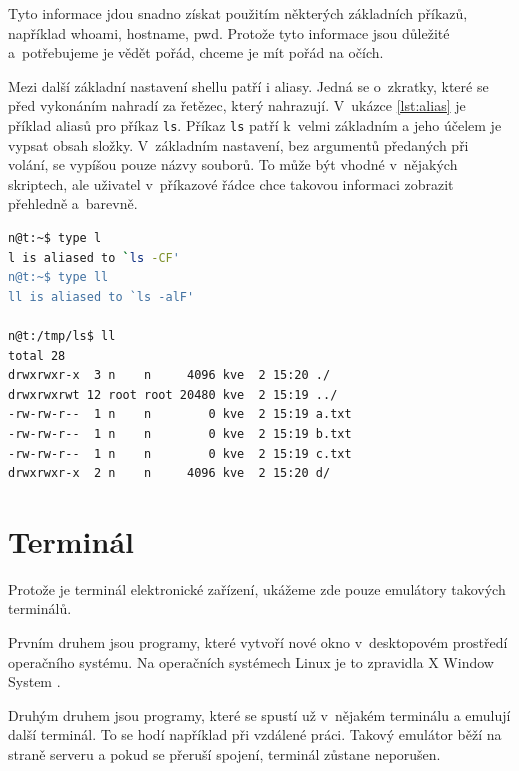 \documentclass[thesis=M,czech]{FITthesis}[2012/06/26]
\begin{document}
Tyto informace jdou snadno získat použitím některých základních příkazů, například whoami, hostname, pwd. Protože tyto informace jsou důležité a~potřebujeme je vědět pořád, chceme je mít pořád na očích.

Mezi další základní nastavení shellu patří i aliasy. Jedná se o~zkratky, které se před vykonáním nahradí za řetězec, který nahrazují. V~ukázce \ref{lst:alias} je příklad aliasů pro příkaz \texttt{ls}. Příkaz \texttt{ls} patří k~velmi základním a jeho účelem je vypsat obsah složky. V~základním nastavení, bez argumentů předaných při volání, se vypíšou pouze názvy souborů. To může být vhodné v~nějakých skriptech, ale uživatel v~příkazové řádce chce takovou informaci zobrazit přehledně a~barevně.

\noindent
\begin{minipage}{\linewidth}
\begin{lstlisting}[language=bash, caption={Příklad použití aliasu v~Bashi}, label={lst:alias}]
n@t:~$ type l
l is aliased to `ls -CF'
n@t:~$ type ll
ll is aliased to `ls -alF'

n@t:/tmp/ls$ ll
total 28
drwxrwxr-x  3 n    n     4096 kve  2 15:20 ./
drwxrwxrwt 12 root root 20480 kve  2 15:19 ../
-rw-rw-r--  1 n    n        0 kve  2 15:19 a.txt
-rw-rw-r--  1 n    n        0 kve  2 15:19 b.txt
-rw-rw-r--  1 n    n        0 kve  2 15:19 c.txt
drwxrwxr-x  2 n    n     4096 kve  2 15:20 d/
\end{lstlisting}
\end{minipage}

%
%
%
\section{Terminál}


Protože je terminál elektronické zařízení, ukážeme zde pouze emulátory takových terminálů.

Prvním druhem jsou programy, které vytvoří nové okno v~desktopovém prostředí operačního systému. Na operačních systémech Linux je to zpravidla X Window System \cite{xorg}.

Druhým druhem jsou programy, které se spustí už v~nějakém terminálu a emulují další terminál. To se hodí například při vzdálené práci. Takový emulátor běží na straně serveru a pokud se přeruší spojení, terminál zůstane neporušen.
\end{document}
